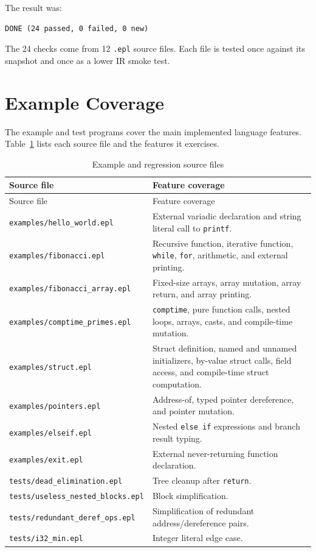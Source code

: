The result was:

\begin{lstlisting}[caption={Test harness summary}]
DONE (24 passed, 0 failed, 0 new)
\end{lstlisting}

The 24 checks come from 12 \texttt{.epl} source files. Each file is tested once
against its \irtree{} snapshot and once as a lower IR smoke test.

\section{Example Coverage}

The example and test programs cover the main implemented language features.
Table~\ref{tab:examples} lists each source file and the features it exercises.

{\footnotesize
\begin{longtable}{p{}p{}}
  \caption{Example and regression source files} \label{tab:examples} \\
  \toprule
  Source file & Feature coverage \\
  \midrule
  \endfirsthead
  \toprule
  Source file & Feature coverage \\
  \midrule
  \endhead
  \texttt{examples/hello\_world.epl} & External variadic declaration and string literal call to \texttt{printf}. \\
  \texttt{examples/fibonacci.epl} & Recursive function, iterative function, \texttt{while}, \texttt{for}, arithmetic, and external printing. \\
  \texttt{examples/fibonacci\_array.epl} & Fixed-size arrays, array mutation, array return, and array printing. \\
  \texttt{examples/comptime\_primes.epl} & \texttt{comptime}, pure function calls, nested loops, arrays, casts, and compile-time mutation. \\
  \texttt{examples/struct.epl} & Struct definition, named and unnamed initializers, by-value struct calls, field access, and compile-time struct computation. \\
  \texttt{examples/pointers.epl} & Address-of, typed pointer dereference, and pointer mutation. \\
  \texttt{examples/elseif.epl} & Nested \texttt{else if} expressions and branch result typing. \\
  \texttt{examples/exit.epl} & External never-returning function declaration. \\
  \texttt{tests/dead\_elimination.epl} & Tree cleanup after \texttt{return}. \\
  \texttt{tests/useless\_nested\_blocks.epl} & Block simplification. \\
  \texttt{tests/redundant\_deref\_ops.epl} & Simplification of redundant address/dereference pairs. \\
  \texttt{tests/i32\_min.epl} & Integer literal edge case. \\
  \bottomrule
\end{longtable}
}

